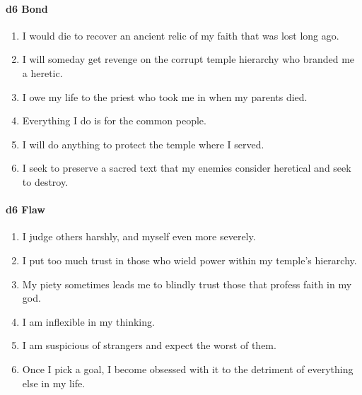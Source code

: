 \documentclass[
]{article}
\providecommand{\tightlist}{%
  \setlength{\itemsep}{0pt}\setlength{\parskip}{0pt}}
\begin{document}
\hypertarget{d6-bond}{%
\paragraph{d6 Bond}\label{d6-bond}}

\begin{enumerate}
\def\labelenumi{\arabic{enumi}.}
\tightlist
\item
  I would die to recover an ancient relic of my faith that was lost long
  ago.
\item
  I will someday get revenge on the corrupt temple hierarchy who branded
  me a heretic.
\item
  I owe my life to the priest who took me in when my parents died.
\item
  Everything I do is for the common people.
\item
  I will do anything to protect the temple where I served.
\item
  I seek to preserve a sacred text that my enemies consider heretical
  and seek to destroy.
\end{enumerate}

\hypertarget{d6-flaw}{%
\paragraph{d6 Flaw}\label{d6-flaw}}

\begin{enumerate}
\def\labelenumi{\arabic{enumi}.}
\tightlist
\item
  I judge others harshly, and myself even more severely.
\item
  I put too much trust in those who wield power within my temple's
  hierarchy.
\item
  My piety sometimes leads me to blindly trust those that profess faith
  in my god.
\item
  I am inflexible in my thinking.
\item
  I am suspicious of strangers and expect the worst of them.
\item
  Once I pick a goal, I become obsessed with it to the detriment of
  everything else in my life.
\end{enumerate}
\end{document}
